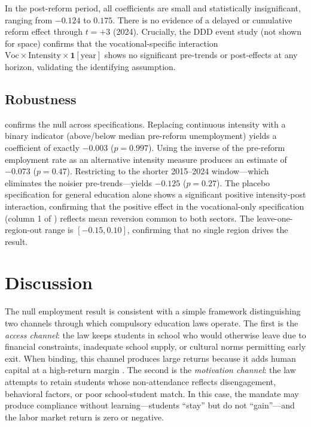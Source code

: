 \documentclass[12pt]{article}
\begin{document}
In the post-reform period, all coefficients are small and statistically insignificant, ranging from $-0.124$ to $0.175$. There is no evidence of a delayed or cumulative reform effect through $t = +3$ (2024). Crucially, the DDD event study (not shown for space) confirms that the vocational-specific interaction $\text{Voc} \times \text{Intensity} \times \mathbf{1}[\text{year}]$ shows no significant pre-trends or post-effects at any horizon, validating the identifying assumption.

\subsection{Robustness}



 confirms the null across specifications. Replacing continuous intensity with a binary indicator (above/below median pre-reform unemployment) yields a coefficient of exactly $-0.003$ ($p = 0.997$). Using the inverse of the pre-reform employment rate as an alternative intensity measure produces an estimate of $-0.073$ ($p = 0.47$). Restricting to the shorter 2015--2024 window---which eliminates the noisier pre-trends---yields $-0.125$ ($p = 0.27$). The placebo specification for general education alone shows a significant positive intensity-post interaction, confirming that the positive effect in the vocational-only specification (column 1 of ) reflects mean reversion common to both sectors. The leave-one-region-out range is $[-0.15, 0.10]$, confirming that no single region drives the result.

\section{Discussion}

The null employment result is consistent with a simple framework distinguishing two channels through which compulsory education laws operate. The first is the \textit{access channel}: the law keeps students in school who would otherwise leave due to financial constraints, inadequate school supply, or cultural norms permitting early exit. When binding, this channel produces large returns because it adds human capital at a high-return margin \citep{AngristKrueger1991, Oreopoulos2006}. The second is the \textit{motivation channel}: the law attempts to retain students whose non-attendance reflects disengagement, behavioral factors, or poor school-student match. In this case, the mandate may produce compliance without learning---students ``stay'' but do not ``gain''---and the labor market return is zero or negative.
\end{document}
